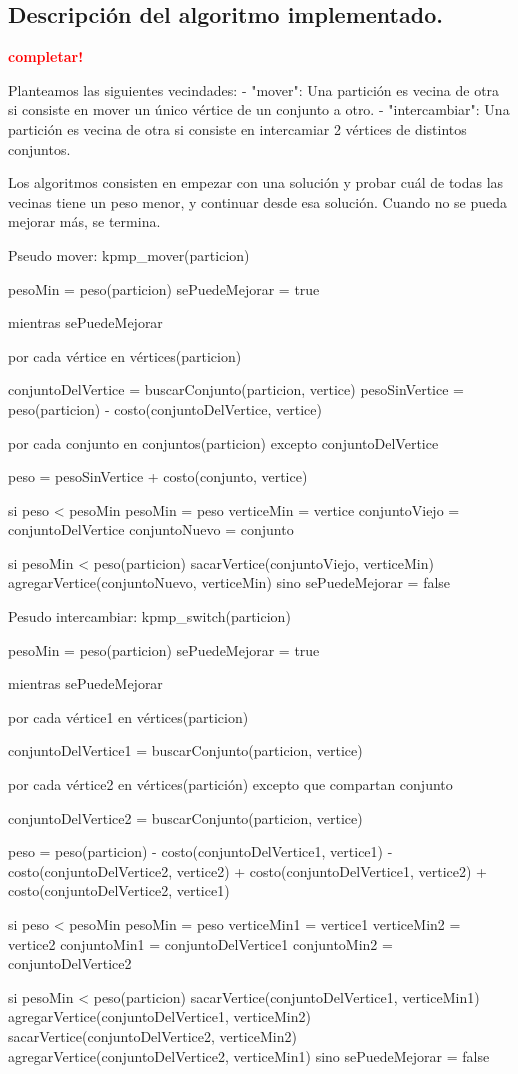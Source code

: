 \subsection{Descripción del algoritmo implementado.}
\vspace*{0.3cm}
\textcolor{red}{\textbf{completar!}}

Planteamos las siguientes vecindades:
- "mover": Una partición es vecina de otra si consiste en mover un único vértice de un conjunto a otro.
- "intercambiar": Una partición es vecina de otra si consiste en intercamiar 2 vértices de distintos conjuntos.

Los algoritmos consisten en empezar con una solución y probar cuál de todas las vecinas tiene un peso menor, y continuar desde esa solución. Cuando no se pueda mejorar más, se termina.

Pseudo mover:
kpmp_mover(particion) {
	pesoMin = peso(particion)
	sePuedeMejorar = true

	mientras sePuedeMejorar {
		por cada vértice en vértices(particion) {
			conjuntoDelVertice = buscarConjunto(particion, vertice)
			pesoSinVertice = peso(particion) - costo(conjuntoDelVertice, vertice)

			por cada conjunto en conjuntos(particion) excepto conjuntoDelVertice {
				peso = pesoSinVertice + costo(conjunto, vertice)

				si peso < pesoMin {
					pesoMin = peso
					verticeMin = vertice
					conjuntoViejo = conjuntoDelVertice
					conjuntoNuevo = conjunto
				}
			}
		}

		si pesoMin < peso(particion) {
			sacarVertice(conjuntoViejo, verticeMin)
			agregarVertice(conjuntoNuevo, verticeMin)
		} sino {
			sePuedeMejorar = false
		}
	}
}

Pesudo intercambiar:
kpmp_switch(particion) {
	pesoMin = peso(particion)
	sePuedeMejorar = true

	mientras sePuedeMejorar {
		por cada vértice1 en vértices(particion) {
			conjuntoDelVertice1 = buscarConjunto(particion, vertice)

			por cada vértice2 en vértices(partición) excepto que compartan conjunto {
				conjuntoDelVertice2 = buscarConjunto(particion, vertice)

				peso = peso(particion)
					- costo(conjuntoDelVertice1, vertice1)
					- costo(conjuntoDelVertice2, vertice2)
					+ costo(conjuntoDelVertice1, vertice2)
					+ costo(conjuntoDelVertice2, vertice1)


				si peso < pesoMin {
					pesoMin = peso
					verticeMin1 = vertice1
					verticeMin2 = vertice2
					conjuntoMin1 = conjuntoDelVertice1
					conjuntoMin2 = conjuntoDelVertice2
				}
			}
		}

		si pesoMin < peso(particion) {
			sacarVertice(conjuntoDelVertice1, verticeMin1)
			agregarVertice(conjuntoDelVertice1, verticeMin2)
			sacarVertice(conjuntoDelVertice2, verticeMin2)
			agregarVertice(conjuntoDelVertice2, verticeMin1)
		} sino {
			sePuedeMejorar = false
		}
	}
}

